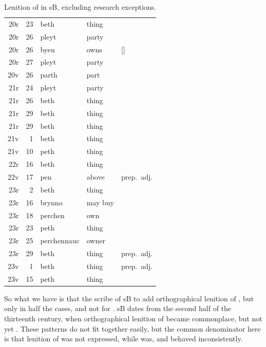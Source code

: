 \begin{table}[h]
  \centering
  \begin{tabular}{ddwql}
    \toprule
     &  &  &  &  \\
    \midrule
    20r & 23 & beth & thing &  \\
    20r & 26 & pleyt & party &  \\
    20r & 26 & byeu & owns & [] \\
    20r & 27 & pleyt & party &  \\
    20v & 26 & parth & part &  \\
    21r & 24 & pleyt & party &  \\
    21r & 26 & beth & thing &  \\
    21r & 29 & beth & thing &  \\
    21r & 29 & beth & thing &  \\
    21v & 1 & beth & thing &  \\
    21v & 10 & peth & thing &  \\
    22r & 16 & beth & thing &  \\
    22v & 17 & pen & above & prep.\ adj. \\
    23r & 2 & beth & thing &  \\
    23r & 16 & brynno & may buy &  \\
    23r & 18 & perchen & own &  \\
    23r & 23 & peth & thing &  \\
    23r & 25 & perchennauc & owner &  \\
    23r & 29 & beth & thing & prep.\ adj. \\
    23v & 1 & beth & thing & prep.\ adj. \\
    23v & 15 & peth & thing &  \\
    \bottomrule
  \end{tabular}%
  \caption{Lenition of  in \gls{sB}, excluding research exceptions.}
  \label{tab:lenpsbexre}%
\end{table}%


So what we have is that the scribe of \gls{sB} to add orthographical lenition of , but only in half the cases, and not for . \Gls{sB} dates from the second half of the thirteenth century, when orthographical lenition of  became commonplace, but not yet . These patterns do not fit together easily, but the common denominator here is that lenition of  was not expressed, while  was, and  behaved inconsistently. 

